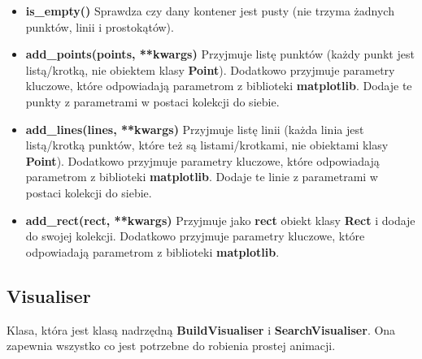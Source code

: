 \documentclass[a4paper, 12pt]{article}
\begin{document}
\begin{itemize}
          \item \textbf{is\_empty()} \vspace{6pt}\newline
          \quad Sprawdza czy dany kontener jest pusty (nie trzyma żadnych punktów, linii i prostokątów).\vspace{6pt}
          
          \item \textbf{add\_points(points, **kwargs)} \vspace{6pt}\newline
          \quad Przyjmuje listę punktów (każdy punkt jest listą/krotką, nie obiektem klasy \textbf{Point}). Dodatkowo przyjmuje parametry kluczowe, które odpowiadają parametrom z biblioteki \textbf{matplotlib}. Dodaje te punkty z parametrami w postaci kolekcji do siebie.\vspace{6pt}
          
          \item \textbf{add\_lines(lines, **kwargs)} \vspace{6pt}\newline 
          \quad Przyjmuje listę linii (każda linia jest listą/krotką punktów, które też są listami/krotkami, nie obiektami klasy \textbf{Point}). Dodatkowo przyjmuje parametry kluczowe, które odpowiadają parametrom z biblioteki \textbf{matplotlib}. Dodaje te linie z parametrami w postaci kolekcji do siebie.\vspace{6pt}
          
          \item \textbf{add\_rect(rect, **kwargs)} \vspace{6pt}\newline
          \quad Przyjmuje jako \textbf{rect} obiekt klasy \textbf{Rect} i dodaje do swojej kolekcji. Dodatkowo przyjmuje parametry kluczowe, które odpowiadają parametrom z biblioteki \textbf{matplotlib}.
      \end{itemize}

    \subsection{Visualiser}
      \quad Klasa, która jest klasą nadrzędną \textbf{BuildVisualiser} i \textbf{SearchVisualiser}. Ona zapewnia wszystko co jest potrzebne do robienia prostej animacji.
\end{document}
